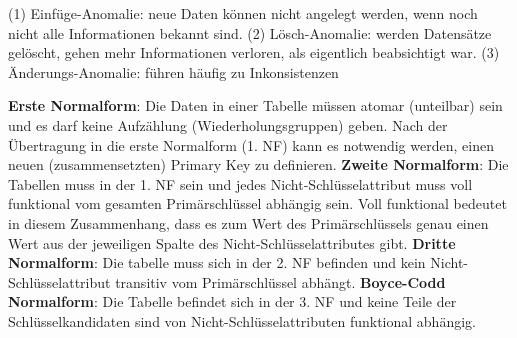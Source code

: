 (1) Einfüge-Anomalie: neue Daten können nicht angelegt werden, wenn noch nicht alle Informationen bekannt sind.
(2) Lösch-Anomalie: werden Datensätze gelöscht, gehen mehr Informationen verloren, als eigentlich beabsichtigt war.
(3) Änderungs-Anomalie: führen häufig zu Inkonsistenzen

{\bf Erste Normalform}: Die Daten in einer Tabelle müssen atomar (unteilbar) sein und es darf keine Aufzählung (Wiederholungsgruppen) geben. Nach der Übertragung in die erste Normalform (1. NF) kann es notwendig werden, einen neuen (zusammensetzten) Primary Key zu definieren.
{\bf Zweite Normalform}: Die Tabellen muss in der 1. NF sein und jedes Nicht-Schlüsselattribut muss voll funktional vom gesamten Primärschlüssel abhängig sein. Voll funktional bedeutet in diesem Zusammenhang, dass es zum Wert des Primärschlüssels genau einen Wert aus der jeweiligen Spalte des Nicht-Schlüsselattributes gibt.
{\bf Dritte Normalform}: Die tabelle muss sich in der 2. NF befinden und kein Nicht-Schlüsselattribut transitiv vom Primärschlüssel abhängt.
{\bf Boyce-Codd Normalform}: Die Tabelle befindet sich in der 3. NF und keine Teile der Schlüsselkandidaten sind von Nicht-Schlüsselattributen funktional abhängig.
